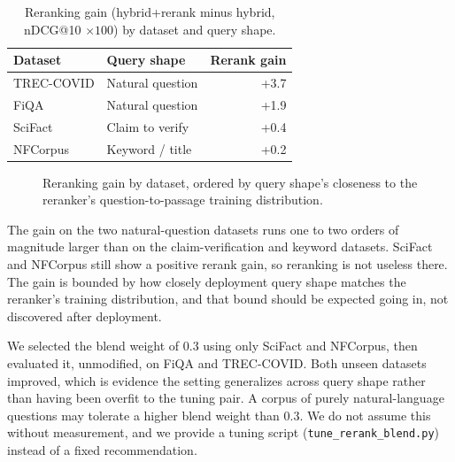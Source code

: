 \documentclass[11pt]{article}
\begin{document}
\begin{table}[h]
\centering
\caption{Reranking gain (hybrid+rerank minus hybrid, nDCG@10 $\times 100$) by dataset and query shape.}
\label{tab:rerank-gain}
\begin{tabular}{llr}
\toprule
Dataset & Query shape & Rerank gain \\
\midrule
TREC-COVID & Natural question & +3.7 \\
FiQA & Natural question & +1.9 \\
SciFact & Claim to verify & +0.4 \\
NFCorpus & Keyword / title & +0.2 \\
\bottomrule
\end{tabular}
\end{table}

\begin{figure}[htbp]
\centering
{}
\caption{Reranking gain by dataset, ordered by query shape's closeness to the reranker's question-to-passage training distribution.}
\label{fig:rerank-gain}
\end{figure}

The gain on the two natural-question datasets runs one to two orders of magnitude larger than on the claim-verification and keyword datasets. SciFact and NFCorpus still show a positive rerank gain, so reranking is not useless there. The gain is bounded by how closely deployment query shape matches the reranker's training distribution, and that bound should be expected going in, not discovered after deployment.

We selected the blend weight of 0.3 using only SciFact and NFCorpus, then evaluated it, unmodified, on FiQA and TREC-COVID. Both unseen datasets improved, which is evidence the setting generalizes across query shape rather than having been overfit to the tuning pair. A corpus of purely natural-language questions may tolerate a higher blend weight than 0.3. We do not assume this without measurement, and we provide a tuning script (\texttt{tune\_rerank\_blend.py}) instead of a fixed recommendation.
\end{document}
